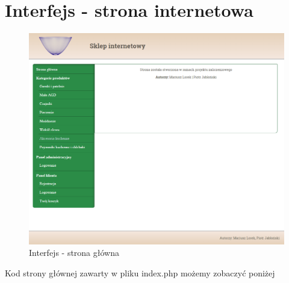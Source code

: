 \chapter{Interfejs - strona internetowa}

\begin{figure}[H]
	\centering
	\includegraphics[width=15 cm] {fig/interfejs}
	\caption{Interfejs - strona główna}
	\label{fig:strona_glowna}
\end{figure}
Kod strony głównej zawarty w pliku index.php możemy zobaczyć poniżej\\
